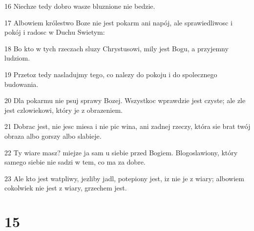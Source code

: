 \par 16 Niechze tedy dobro wasze bluznione nie bedzie.
\par 17 Albowiem królestwo Boze nie jest pokarm ani napój, ale sprawiedliwosc i pokój i radosc w Duchu Swietym:
\par 18 Bo kto w tych rzeczach sluzy Chrystusowi, mily jest Bogu, a przyjemny ludziom.
\par 19 Przetoz tedy nasladujmy tego, co nalezy do pokoju i do spolecznego budowania.
\par 20 Dla pokarmu nie psuj sprawy Bozej. Wszystkoc wprawdzie jest czyste; ale zle jest czlowiekowi, który je z obrazeniem.
\par 21 Dobrac jest, nie jesc miesa i nie pic wina, ani zadnej rzeczy, która sie brat twój obraza albo gorszy albo slabieje.
\par 22 Ty wiare masz? miejze ja sam u siebie przed Bogiem. Blogoslawiony, który samego siebie nie sadzi w tem, co ma za dobre.
\par 23 Ale kto jest watpliwy, jezliby jadl, potepiony jest, iz nie je z wiary; albowiem cokolwiek nie jest z wiary, grzechem jest.

\chapter{15}

